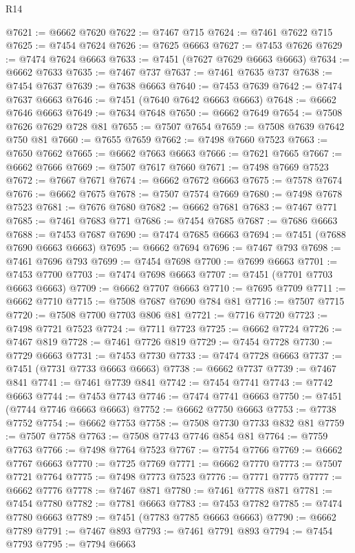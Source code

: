 \begin{lexlean}{R14}
\begin{coremodule}
{{{{{{{{{{{{{{{{{{{{{{{{{{{{{{{{{{{{{{{{{{{{{{{{{{{{{{{{{{{{{{{{{{{{{{{{{{{{{{{{{{@7621 := @6662 @7620
@7622 := @7467 @715
@7624 := @7461 @7622 @715
@7625 := @7454 @7624
@7626 := @7625 @6663
@7627 := @7453 @7626
@7629 := @7474 @7624 @6663
@7633 := @7451 (@7627 @7629 @6663 @6663)
@7634 := @6662 @7633
@7635 := @7467 @737
@7637 := @7461 @7635 @737
@7638 := @7454 @7637
@7639 := @7638 @6663
@7640 := @7453 @7639
@7642 := @7474 @7637 @6663
@7646 := @7451 (@7640 @7642 @6663 @6663)
@7648 := @6662 @7646 @6663
@7649 := @7634 @7648
@7650 := @6662 @7649
@7654 := @7508 @7626 @7629 @728 @81
@7655 := @7507 @7654
@7659 := @7508 @7639 @7642 @750 @81
@7660 := @7655 @7659
@7662 := @7498 @7660 @7523
@7663 := @7650 @7662
@7665 := @6662 @7663 @6663
@7666 := @7621 @7665
@7667 := @6662 @7666
@7669 := @7507 @7617 @7660
@7671 := @7498 @7669 @7523
@7672 := @7667 @7671
@7674 := @6662 @7672 @6663
@7675 := @7578 @7674
@7676 := @6662 @7675
@7678 := @7507 @7574 @7669
@7680 := @7498 @7678 @7523
@7681 := @7676 @7680
@7682 := @6662 @7681
@7683 := @7467 @771
@7685 := @7461 @7683 @771
@7686 := @7454 @7685
@7687 := @7686 @6663
@7688 := @7453 @7687
@7690 := @7474 @7685 @6663
@7694 := @7451 (@7688 @7690 @6663 @6663)
@7695 := @6662 @7694
@7696 := @7467 @793
@7698 := @7461 @7696 @793
@7699 := @7454 @7698
@7700 := @7699 @6663
@7701 := @7453 @7700
@7703 := @7474 @7698 @6663
@7707 := @7451 (@7701 @7703 @6663 @6663)
@7709 := @6662 @7707 @6663
@7710 := @7695 @7709
@7711 := @6662 @7710
@7715 := @7508 @7687 @7690 @784 @81
@7716 := @7507 @7715
@7720 := @7508 @7700 @7703 @806 @81
@7721 := @7716 @7720
@7723 := @7498 @7721 @7523
@7724 := @7711 @7723
@7725 := @6662 @7724
@7726 := @7467 @819
@7728 := @7461 @7726 @819
@7729 := @7454 @7728
@7730 := @7729 @6663
@7731 := @7453 @7730
@7733 := @7474 @7728 @6663
@7737 := @7451 (@7731 @7733 @6663 @6663)
@7738 := @6662 @7737
@7739 := @7467 @841
@7741 := @7461 @7739 @841
@7742 := @7454 @7741
@7743 := @7742 @6663
@7744 := @7453 @7743
@7746 := @7474 @7741 @6663
@7750 := @7451 (@7744 @7746 @6663 @6663)
@7752 := @6662 @7750 @6663
@7753 := @7738 @7752
@7754 := @6662 @7753
@7758 := @7508 @7730 @7733 @832 @81
@7759 := @7507 @7758
@7763 := @7508 @7743 @7746 @854 @81
@7764 := @7759 @7763
@7766 := @7498 @7764 @7523
@7767 := @7754 @7766
@7769 := @6662 @7767 @6663
@7770 := @7725 @7769
@7771 := @6662 @7770
@7773 := @7507 @7721 @7764
@7775 := @7498 @7773 @7523
@7776 := @7771 @7775
@7777 := @6662 @7776
@7778 := @7467 @871
@7780 := @7461 @7778 @871
@7781 := @7454 @7780
@7782 := @7781 @6663
@7783 := @7453 @7782
@7785 := @7474 @7780 @6663
@7789 := @7451 (@7783 @7785 @6663 @6663)
@7790 := @6662 @7789
@7791 := @7467 @893
@7793 := @7461 @7791 @893
@7794 := @7454 @7793
@7795 := @7794 @6663
}}}}}}}}}}}}}}}}}}}}}}}}}}}}}}}}}}}}}}}}}}}}}}}}}}}}}}}}}}}}}}}}}}}}}}}}}}}}}}}}}}
\end{coremodule}
\end{lexlean}
